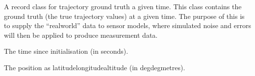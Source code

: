 \documentclass[letterpaper,10pt,english]{sphinxmanual}
\begin{document}
\begin{fulllineitems}
\label{\detokenize{modules/waypoints/trajectory:qnav.waypoints.trajectory.GroundTruth}}
\pysigstartsignatures
{}
\pysigstopsignatures
\sphinxAtStartPar
A record class for trajectory ground truth a given time.
This class contains the ground truth (the true trajectory values) at a
given time. The purpose of this is to supply the “real\sphinxhyphen{}world” data to
sensor models, where simulated noise and errors will then be applied to
produce measurement data.

\begin{fulllineitems}
\label{\detokenize{modules/waypoints/trajectory:qnav.waypoints.trajectory.GroundTruth.timestamp}}
\pysigstartsignatures
{}
\pysigstopsignatures
\sphinxAtStartPar
The time since initialisation (in seconds).

\end{fulllineitems}


\begin{fulllineitems}
\label{\detokenize{modules/waypoints/trajectory:qnav.waypoints.trajectory.GroundTruth.position}}
\pysigstartsignatures
{}
\pysigstopsignatures
\sphinxAtStartPar
The position as latitude\sphinxhyphen{}longitude\sphinxhyphen{}altitude (in deg\sphinxhyphen{}deg\sphinxhyphen{}metres).


\end{fulllineitems}
\end{fulllineitems}
\end{document}
